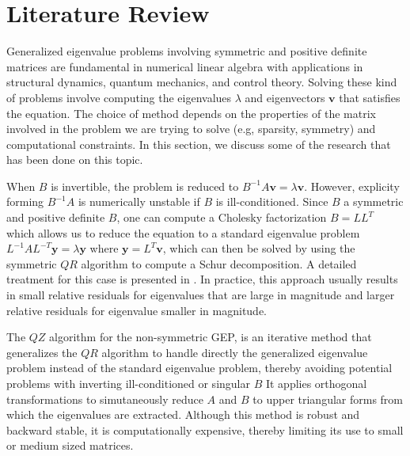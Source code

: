 \section{Literature Review}\label{sec:LiteratureReview}
Generalized eigenvalue problems involving symmetric and positive definite matrices are fundamental in numerical linear algebra with applications in structural  dynamics, quantum mechanics, and control theory. Solving these kind of problems involve computing the eigenvalues $\lambda$ and eigenvectors $\mathbf{v}$ that satisfies the equation. The choice of method depends on the properties of the matrix involved in the problem we are trying to solve (e.g, sparsity, symmetry) and computational constraints. In this section, we discuss some of the research that has been done on this topic.

When $B$ is invertible, the problem is reduced to $B^{-1}A\mathbf{v} = \lambda \mathbf{v}$. However, explicity forming $B^{-1}A$ is numerically unstable if $B$ is ill-conditioned. Since $B$ a symmetric and positive definite $B$, one can compute a Cholesky factorization $B = LL^{T}$ which allows us to reduce the equation to a standard eigenvalue problem $L^{-1}AL^{-T}\mathbf{y} = \lambda \mathbf{y}$ where $\mathbf{y}= L^T \mathbf{v}$, which can then be solved by using the symmetric $QR$ algorithm to compute a Schur decomposition. A detailed treatment for this case is presented in \cite{doi:10.1137/1.9781421407944}. In practice, this approach usually results in small relative residuals for eigenvalues that are large in magnitude and larger relative residuals for eigenvalue smaller in magnitude.

The $QZ$ algorithm \cite{5b3d5fb1-4813-3046-9331-a730b392f611} for the non-symmetric GEP, is an iterative method that generalizes the $QR$ algorithm to handle directly the generalized eigenvalue problem instead of the standard eigenvalue problem, thereby avoiding potential problems with inverting ill-conditioned or singular $B$ It applies orthogonal transformations to simutaneously reduce $A$ and $B$ to upper triangular forms from which the eigenvalues are extracted. Although this method is robust and backward stable, it is computationally expensive, thereby limiting its use to small or medium sized matrices.

